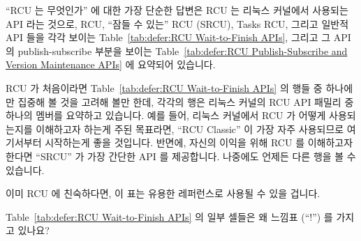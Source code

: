 ``RCU 는 무엇인가'' 에 대한 가장 단순한 답변은 RCU 는 리눅스 커널에서
사용되는 API 라는 것으로, RCU, ``잠들 수 있는'' RCU (SRCU), Tasks RCU, 그리고
일반적 API 들을 각각 보이는 Table~\ref{tab:defer:RCU Wait-to-Finish APIs},
그리고 그 API 의 publish-subscribe 부분을 보이는
Table~\ref{tab:defer:RCU Publish-Subscribe and Version Maintenance APIs} 에
요약되어 있습니다.

RCU 가 처음이라면
Table~\ref{tab:defer:RCU Wait-to-Finish APIs} 의 행들 중 하나에만 집중해 볼
것을 고려해 볼만 한데, 각각의 행은 리눅스 커널의 RCU API 패밀리 중 하나의
멤버를 요약하고 있습니다.
예를 들어, 리눅스 커널에서 RCU 가 어떻게 사용되는지를 이해하고자 하는게 주된
목표라면, ``RCU Classic'' 이 가장 자주 사용되므로 여기서부터 시작하는게 좋을
것입니다.
반면에, 자신의 이익을 위해 RCU 를 이해하고자 한다면 ``SRCU'' 가 가장 간단한 API
를 제공합니다.
나중에도 언제든 다른 행을 볼 수 있습니다.

이미 RCU 에 친숙하다면, 이 표는 유용한 레퍼런스로 사용될 수 있을 겁니다.

\QuickQuiz{}
	Table~\ref{tab:defer:RCU Wait-to-Finish APIs} 의 일부 셀들은 왜 느낌표
	(``!'') 를 가지고 있나요?
	\iffalse

